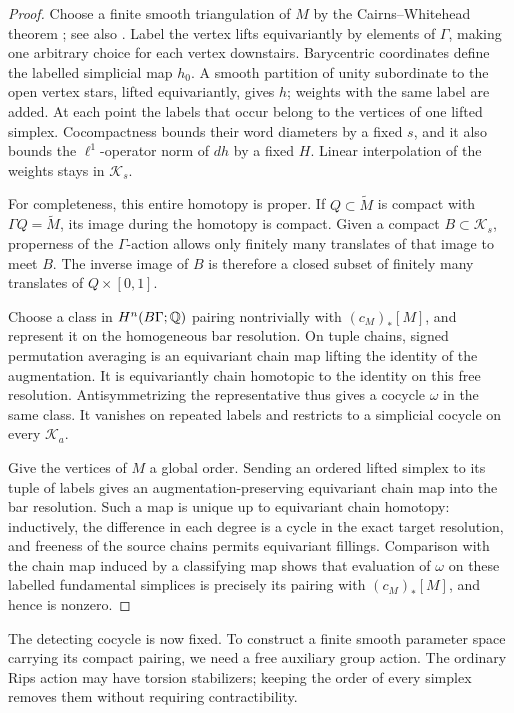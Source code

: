 \begin{proof}
Choose a finite smooth triangulation of $M$ by the Cairns--Whitehead
theorem \cite{Cairns1934,Whitehead1940}; see also
\cite[Theorem~10.6]{Munkres1966}. Label the vertex lifts
equivariantly by elements of $\Gamma$, making one arbitrary choice for
each vertex downstairs.  Barycentric coordinates define the labelled
simplicial map $h_0$.  A smooth partition of unity subordinate to the
open vertex stars, lifted equivariantly, gives $h$; weights with the same
label are added.  At each point the labels that occur belong to the
vertices of one lifted simplex.  Cocompactness bounds their word
diameters by a fixed $s$, and it also bounds the $\ell^1$-operator norm
of $dh$ by a fixed $H$.  Linear interpolation of the weights stays in
$\mathcal K_s$.

For completeness, this entire homotopy is proper.  If $Q\subset
\widetilde M$ is compact with $\Gamma Q=\widetilde M$, its image during
the homotopy is compact.  Given a compact $B\subset\mathcal K_s$,
properness of the $\Gamma$-action allows only finitely many translates
of that image to meet $B$.  The inverse image of $B$ is therefore a
closed subset of finitely many translates of $Q\times[0,1]$.

Choose a class in $H^n(B\Gamma;\mathbb Q)$ pairing nontrivially with
$(c_M)_*[M]$, and represent it on the homogeneous bar resolution.  On
tuple chains, signed permutation averaging is an equivariant chain map
lifting the identity of the augmentation.  It is equivariantly chain
homotopic to the identity on this free resolution.  Antisymmetrizing
the representative thus gives a cocycle $\omega$ in the same class.
It vanishes on repeated labels and restricts to a simplicial cocycle on
every $\mathcal K_a$.

Give the vertices of $M$ a global order.  Sending an ordered lifted
simplex to its tuple of labels gives an augmentation-preserving
equivariant chain map into the bar resolution.  Such a map is unique
up to equivariant chain homotopy: inductively, the difference in each
degree is a cycle in the exact target resolution, and freeness of the
source chains permits equivariant fillings.  Comparison with the chain
map induced by a classifying map shows that evaluation of $\omega$ on
these labelled fundamental simplices is precisely its pairing with
$(c_M)_*[M]$, and hence is nonzero.
\end{proof}

The detecting cocycle is now fixed. To construct a finite smooth parameter
space carrying its compact pairing, we need a free auxiliary group action.
The ordinary Rips action may have torsion stabilizers; keeping the order
of every simplex removes them without requiring contractibility.

